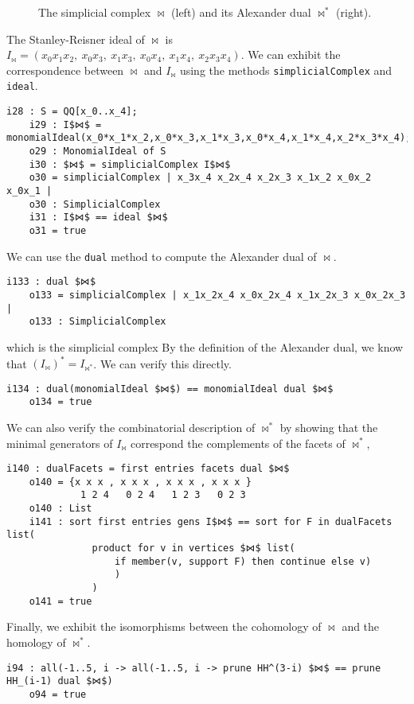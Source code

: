 \documentclass[12pt,leqno]{amsart}
\theoremstyle{definition}
\newenvironment{example}
{\pushQED{\qed}\renewcommand{\qedsymbol}{$\diamond$}\examplex}
{\popQED\endexamplex}
\begin{document}
\begin{example}
\begin{figure}[h]
\begin{subfigure}{0.3\textwidth}
    \end{subfigure}
    \caption{The simplicial complex $\bowtie$ (left) and its Alexander dual $\bowtie^*$ (right).}\label{the figure-8 and its dual}
  \end{figure}
  The Stanley-Reisner ideal of $\bowtie$ is $I_{\bowtie} = (x_0x_1x_2,\ x_0x_3,\ x_1x_3,\ x_0x_4,\ x_1x_4,\ x_2x_3x_4)$. We can exhibit the correspondence between $\bowtie$ and $I_{\bowtie}$ using the methods \texttt{simplicialComplex} and \texttt{ideal}.
  \begin{lstlisting}[basicstyle={\ttfamily \scriptsize}, xleftmargin=-23pt]
    i28 : S = QQ[x_0..x_4];
    i29 : I$⋈$ = monomialIdeal(x_0*x_1*x_2,x_0*x_3,x_1*x_3,x_0*x_4,x_1*x_4,x_2*x_3*x_4);
    o29 : MonomialIdeal of S
    i30 : $⋈$ = simplicialComplex I$⋈$
    o30 = simplicialComplex | x_3x_4 x_2x_4 x_2x_3 x_1x_2 x_0x_2 x_0x_1 |
    o30 : SimplicialComplex
    i31 : I$⋈$ == ideal $⋈$
    o31 = true
  \end{lstlisting}
  We can use the \texttt{dual} method to compute the Alexander dual of $\bowtie$.
\begin{lstlisting}[basicstyle={\ttfamily \scriptsize}, xleftmargin=-23pt]
    i133 : dual $⋈$
    o133 = simplicialComplex | x_1x_2x_4 x_0x_2x_4 x_1x_2x_3 x_0x_2x_3 |
    o133 : SimplicialComplex
\end{lstlisting}
  which is the simplicial complex
  By the definition of the Alexander dual, we know that $(I_{\bowtie})^* = I_{\bowtie^*}$. We can verify this directly.
\begin{lstlisting}[basicstyle={\ttfamily \scriptsize}, xleftmargin=-23pt]
    i134 : dual(monomialIdeal $⋈$) == monomialIdeal dual $⋈$
    o134 = true
\end{lstlisting}
  We can also verify the combinatorial description of $\bowtie^*$ by showing that the minimal generators of $I_{\bowtie}$ correspond the complements of the facets of $\bowtie^*$,
\begin{lstlisting}[basicstyle={\ttfamily \scriptsize}, xleftmargin=-23pt]
    i140 : dualFacets = first entries facets dual $⋈$
    o140 = {x x x , x x x , x x x , x x x }
             1 2 4   0 2 4   1 2 3   0 2 3
    o140 : List
    i141 : sort first entries gens I$⋈$ == sort for F in dualFacets list(
               product for v in vertices $⋈$ list(
                   if member(v, support F) then continue else v)
                   )
               )
    o141 = true
\end{lstlisting}
  Finally, we exhibit the isomorphisms between the cohomology of $\bowtie$ and the homology of $\bowtie^*$.
\begin{lstlisting}[basicstyle={\ttfamily \scriptsize}, xleftmargin=-23pt]
    i94 : all(-1..5, i -> all(-1..5, i -> prune HH^(3-i) $⋈$ == prune HH_(i-1) dual $⋈$)
    o94 = true
\end{lstlisting}  
\end{example}
\end{document}
